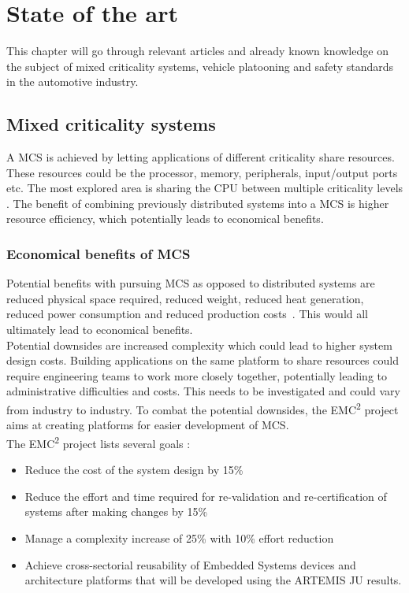 \chapter{State of the art}
This chapter will go through relevant articles and already known knowledge on the subject of mixed criticality systems, vehicle platooning and safety standards in the automotive industry.

\section{Mixed criticality systems}
A MCS is achieved by letting applications of different criticality share resources. These resources could be the processor, memory, peripherals, input/output ports etc. The most explored area is sharing the CPU between multiple criticality levels \cite{burns2016}. The benefit of combining previously distributed systems into a MCS is higher resource efficiency, which potentially leads to economical benefits.


\subsection{Economical benefits of MCS}
Potential benefits with pursuing MCS as opposed to distributed systems are reduced physical space required, reduced weight, reduced heat generation, reduced power consumption and reduced production costs~\cite{burns2016}. This would all ultimately lead to economical benefits.\\

Potential downsides are increased complexity which could lead to higher system design costs. Building applications on the same platform to share resources could require engineering teams to work more closely together, potentially leading to administrative difficulties and costs. This needs to be investigated and could vary from industry to industry. To combat the potential downsides, the EMC\textsuperscript{2} project aims at creating platforms for easier development of MCS.\\ %

The EMC\textsuperscript{2} project lists several goals \cite{website:emc2goals}:
\begin{itemize}
\item Reduce the cost of the system design by 15\%
\item Reduce the effort and time required for re-validation and re-certification of systems after making changes by 15\%
\item Manage a complexity increase of 25\% with 10\% effort reduction
\item Achieve cross-sectorial reusability of Embedded Systems devices and architecture platforms that will be developed using the ARTEMIS JU results.
\end{itemize}

